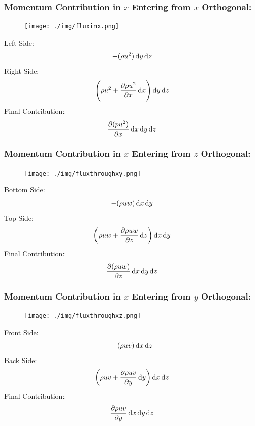 \subsubsection{Momentum Contribution in $x$ Entering from $x$ Orthogonal:}
\begin{figure}[H]
  \centering
  \texttt{[image: ./img/fluxinx.png]}
\end{figure}
Left Side:
\begin{gather}
  -(\rho u^2)\dif y \dif z
\end{gather}
Right Side:
\begin{gather}
  \left(\rho u^2 + \frac{\partial \rho u^2}{\partial x} \dif x \right) \dif y \dif z
\end{gather}
Final Contribution:
\begin{equation}
  \frac{\partial (p u^2)}{\partial x} \dif x \dif y \dif z
  \label{xmomentumcontribution}
\end{equation}
\subsubsection{Momentum Contribution in $x$ Entering from $z$ Orthogonal:}
\begin{figure}[H]
  \centering
  \texttt{[image: ./img/fluxthroughxy.png]}
\end{figure}
Bottom Side:
\begin{gather}
  -(\rho u w) \dif x \dif y
\end{gather}
Top Side:
\begin{gather}
  \left(\rho u w + \frac{\partial \rho u w}{\partial z} \dif z \right) \dif x \dif y
\end{gather}
Final Contribution:
\begin{equation}
  \frac{\partial (\rho u w)}{\partial z} \dif x \dif y \dif z
  \label{zmomentumcontribution}
\end{equation}
\subsubsection{Momentum Contribution in $x$ Entering from $y$ Orthogonal:}
\begin{figure}[H]
  \centering
  \texttt{[image: ./img/fluxthroughxz.png]}
\end{figure}
Front Side:
\begin{gather}
  -(\rho u v) \dif x \dif z
\end{gather}
Back Side:
\begin{gather}
  \left(\rho u v + \frac{\partial \rho u v}{\partial y} \dif y \right) \dif x \dif z
\end{gather}
Final Contribution:
\begin{equation}
  \frac{\partial \rho u v}{\partial y} \dif x \dif y \dif z
  \label{ymomentumcontribution}
\end{equation}
